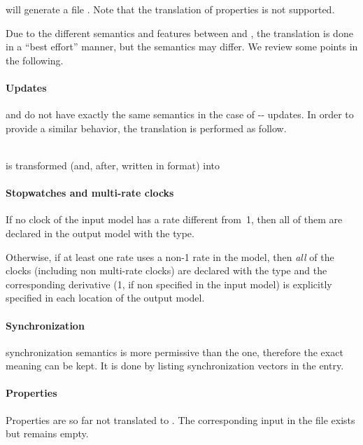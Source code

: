 \imitator{} will generate a file .
Note that the translation of properties is not supported.

Due to the different semantics and features between \imitator{} and \jani{}, the translation is done in a ``best effort'' manner, but the semantics may differ.
We review some points in the following.

\paragraph{Updates}
\imitator{} and \jani{} do not have exactly the same semantics in the case of -- updates.
In order to provide a similar behavior, the translation is performed as follow.

\\ is transformed (and, after, written in \jani{} format) into


\paragraph{Stopwatches and multi-rate clocks}
If no clock of the input model has a rate different from~1, then all of them are declared in the output \jani{} model with the  type.

Otherwise, if at least one rate uses a non-1 rate in the \imitator{} model, then \emph{all} of the clocks (including non multi-rate clocks) are declared with the  type and the corresponding derivative (1, if non specified in the \imitator{} input model) is explicitly specified in each location of the output model.

\paragraph{Synchronization}
\jani{} synchronization semantics is more permissive than the \imitator{} one, therefore the exact meaning can be kept.
It is done by listing synchronization vectors in the  entry.

\paragraph{Properties}
Properties are so far not translated to \jani{}.
The corresponding input in the \jani{} file exists but remains empty.

